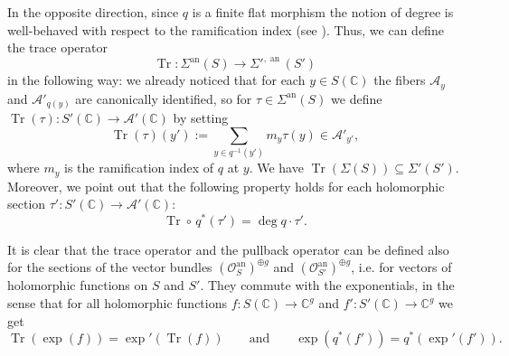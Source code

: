 \documentclass[10 pt,a4paper]{article}
\theoremstyle{plain}
\theoremstyle{definition}
\theoremstyle{named}
\DeclareMathOperator{\Tr}{Tr}
\newcommand{\cA}{\mathcal A}
\newcommand{\bC}{\mathbb C}
\newcommand{\cO}{\mathcal O}
\DeclareMathOperator{\an}{an}
\begin{document}
In the opposite direction, since $q$ is a finite flat morphism the notion of degree is well-behaved with respect to the ramification index (see \cite[Proposition 12.21]{GorWed}). Thus, we can define the trace operator
\[
\Tr: \Sigma^{\an}(S) \to \Sigma'^{,\an}(S')
\]
in the following way: we already noticed that for each $y \in S(\bC)$ the fibers $\cA_y$ and $\cA'_{q(y)}$ are canonically identified, so for $\tau \in \Sigma^{\an}(S)$ we define $\Tr(\tau):S'(\bC) \to \cA'(\bC)$ by setting
\begin{equation}\label{the_trace}
\Tr(\tau)(y'):=\sum_{y \in q^{-1}(y')} m_y\tau(y) \in \cA'_{y'},
\end{equation}
where $m_y$ is the ramification index of $q$ at $y$. We have $\Tr(\Sigma(S)) \subseteq \Sigma'(S')$. Moreover, we point out that the following property holds for each holomorphic section $\tau':S'(\bC) \rightarrow \cA'(\bC)$:
\begin{equation}\label{propTrPu}
    \Tr \circ \, q^*(\tau') = \deg{q}\cdot \tau'.
\end{equation}

It is clear that the trace operator and the pullback operator can be defined also for the sections of the vector bundles $\left(\cO^{\an}_S\right)^{\oplus g}$ and $\left(\cO^{\an}_{S'}\right)^{\oplus g}$, i.e. for vectors of holomorphic functions on $S$ and $S'$. They commute with the exponentials, in the sense that for all holomorphic functions $f:S(\bC) \rightarrow \bC^g$ and $f':S'(\bC) \rightarrow \bC^g$ we get
\begin{equation}\label{propTrExp}
    \Tr(\exp(f)) = \exp'(\Tr(f)) \qquad \textrm{and} \qquad \exp(q^*(f')) = q^*(\exp'(f')).
\end{equation}
\end{document}
